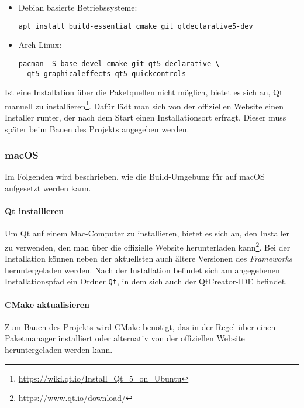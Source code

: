 \begin{itemize}
	\item Debian basierte Betriebssysteme:
	\begin{lstlisting}
apt install build-essential cmake git qtdeclarative5-dev
	\end{lstlisting}

	\item Arch Linux:
	\begin{lstlisting}
pacman -S base-devel cmake git qt5-declarative \
  qt5-graphicaleffects qt5-quickcontrols
	\end{lstlisting}
\end{itemize}
\vspace{-0.2cm}
Ist eine Installation über die Paketquellen nicht möglich, bietet es sich an, Qt
manuell zu
installieren\footnote{\url{https://wiki.qt.io/Install_Qt_5_on_Ubuntu}}. Dafür
lädt man sich von der offiziellen Website einen Installer runter, der nach dem
Start einen Installationsort erfragt. Dieser muss später beim Bauen des Projekts
angegeben werden.
\vspace{0.4cm}

\pagebreak

\pagebreak

\subsubsection{macOS}

Im Folgenden wird beschrieben, wie die Build-Umgebung für \erasim{} auf macOS
aufgesetzt werden kann.

\paragraph{Qt installieren}

Um Qt auf einem Mac-Computer zu installieren, bietet es sich an, den Installer
zu verwenden, den man über die offizielle Website herunterladen
kann\footnote{\url{https://www.qt.io/download/}}. Bei der Installation können
neben der aktuellsten auch ältere Versionen des \emph{Frameworks}
heruntergeladen werden. Nach der Installation befindet sich am angegebenen
Installationspfad ein Ordner \texttt{Qt}, in dem sich auch der QtCreator-IDE
befindet.

\paragraph{CMake aktualisieren}

Zum Bauen des Projekts wird CMake benötigt, das in der Regel über einen
Paketmanager installiert oder alternativ von der offiziellen Website
heruntergeladen werden kann.

